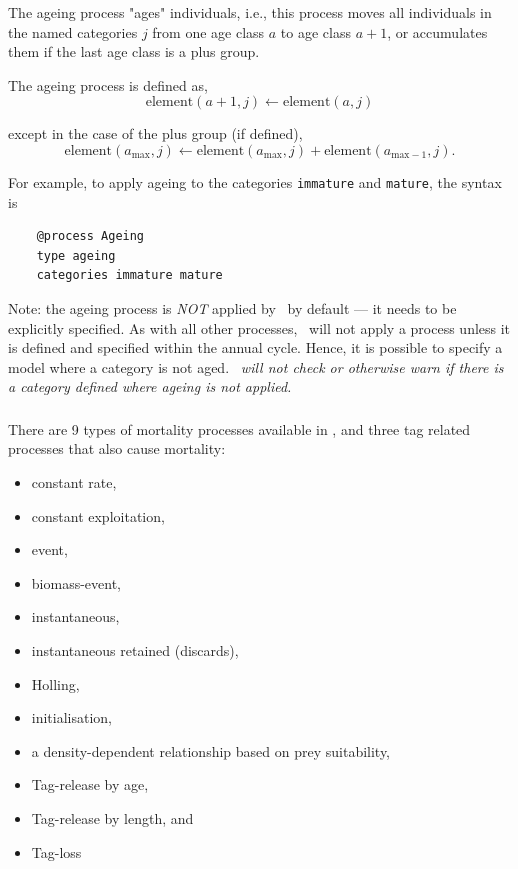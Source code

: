 The ageing process "ages" individuals, i.e., this process moves all individuals in the named categories $j$ from one age class $a$ to age class $a + 1$, or accumulates them if the last age class is a plus group.

The ageing process is defined as,
\begin{equation}
  \text{element}(a + 1,j) \leftarrow \text{element}(a,j)
\end{equation}

except in the case of the plus group (if defined),
\begin{equation}
  \text{element}(a_{\text{max}}, j) \leftarrow \text{element}(a_{\text{max}}, j) + \text{element}(a_{\text{max}-1}, j).
\end{equation}

For example, to apply ageing to the categories \texttt{immature} and \texttt{mature}, the syntax is

{\small{\begin{verbatim}
	@process Ageing
	type ageing
	categories immature mature
	\end{verbatim}}}

Note: the ageing process is \emph{NOT} applied by \CNAME\ by default --- it needs to be explicitly specified. As with all other processes, \CNAME\ will not apply a process unless it is defined and specified within the annual cycle. Hence, it is possible to specify a model where a category is not aged. \emph{\CNAME\ will not check or otherwise warn if there is a category defined where ageing is not applied.}

\subsubsection{\label{sec:Process-Mortality}}

There are 9 types of mortality processes available in \CNAME, and three tag related processes that also cause mortality:

\begin{itemize}
	\item constant rate,
	\item constant exploitation,
	\item event,
	\item biomass-event,
	\item instantaneous,
	\item instantaneous retained (discards),
	\item Holling,
	\item initialisation,
	\item a density-dependent relationship based on prey suitability,
	\item Tag-release by age,
	\item Tag-release by length, and	
	\item Tag-loss
\end{itemize}

